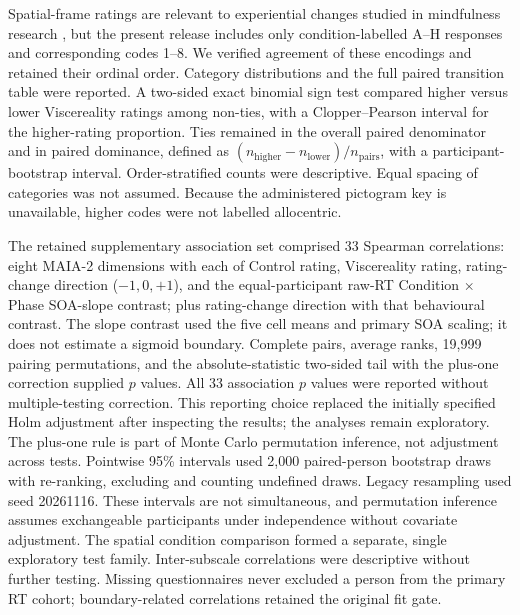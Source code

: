 Spatial-frame ratings are relevant to experiential changes studied in mindfulness research \citep{hanley_2020}, but the present release includes only condition-labelled A--H responses and corresponding codes 1--8. We verified agreement of these encodings and retained their ordinal order. Category distributions and the full paired transition table were reported. A two-sided exact binomial sign test compared higher versus lower Viscereality ratings among non-ties, with a Clopper--Pearson interval for the higher-rating proportion. Ties remained in the overall paired denominator and in paired dominance, defined as $(n_{\mathrm{higher}}-n_{\mathrm{lower}})/n_{\mathrm{pairs}}$, with a participant-bootstrap interval. Order-stratified counts were descriptive. Equal spacing of categories was not assumed. Because the administered pictogram key is unavailable, higher codes were not labelled allocentric.

The retained supplementary association set comprised 33 Spearman correlations: eight MAIA-2 dimensions with each of Control rating, Viscereality rating, rating-change direction ($-1,0,+1$), and the equal-participant raw-RT Condition $\times$ Phase SOA-slope contrast; plus rating-change direction with that behavioural contrast. The slope contrast used the five cell means and primary SOA scaling; it does not estimate a sigmoid boundary. Complete pairs, average ranks, 19,999 pairing permutations, and the absolute-statistic two-sided tail with the plus-one correction supplied $p$ values. All 33 association $p$ values were reported without multiple-testing correction. This reporting choice replaced the initially specified Holm adjustment after inspecting the results; the analyses remain exploratory. The plus-one rule is part of Monte Carlo permutation inference, not adjustment across tests. Pointwise 95\% intervals used 2,000 paired-person bootstrap draws with re-ranking, excluding and counting undefined draws. Legacy resampling used seed 20261116. These intervals are not simultaneous, and permutation inference assumes exchangeable participants under independence without covariate adjustment. The spatial condition comparison formed a separate, single exploratory test family. Inter-subscale correlations were descriptive without further testing. Missing questionnaires never excluded a person from the primary RT cohort; boundary-related correlations retained the original fit gate.

